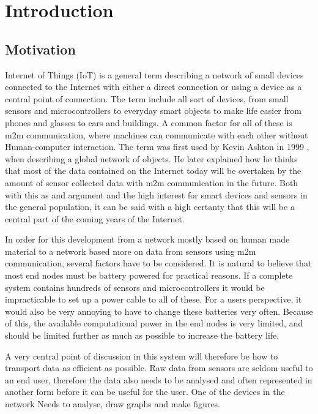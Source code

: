 \chapter{Introduction}
\label{chp:introduction} 


\section{Motivation}

Internet of Things (IoT) is a general term describing a network of small devices connected to the Internet with either a direct connection or using a device as a central point of connection. The term include all sort of devices, from small sensors and microcontrollers to everyday smart objects to make life easier from phones and glasses to cars and buildings. A common factor for all of these is \gls{m2m} communication, where machines can communicate with each other without Human-computer interaction. The term was first used by Kevin Ashton in 1999 \cite{ashton2009internet}, when describing a global network of objects. He later explained how he thinks that most of the data contained on the Internet today will be overtaken by the amount of sensor collected data with \gls{m2m} communication in the future. Both with this as and argument and the high interest for smart devices and sensors in the general population, it can be said with a high certanty that this will be a central part of the coming years of the Internet. 

In order for this development from a network mostly based on human made material to a network based more on data from sensors using \gls{m2m} communication, several factors have to be considered. It is natural to believe that most end nodes must be battery powered for practical reasons. If a complete system contains hundreds of sensors and microcontrollers it would be impracticable to set up a power cable to all of these. For a users perspective, it would also be very annoying to have to change these batteries very often. Because of this, the available computational power in the end nodes is very limited, and should be limited further as much as possible to increase the battery life. 

A very central point of discussion in this system will therefore be how to transport data as efficient as possible. Raw data from sensors are seldom useful to an end user, therefore the data also needs to be analysed and often represented in another form before it can be useful for the user. One of the devices in the network  Needs to analyse, draw graphs and make figures. 


